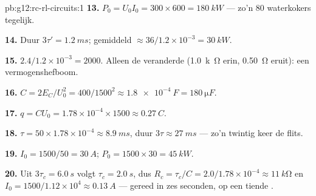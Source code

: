 \begin{solution}{pb:g12:rc-rl-circuits:1}
\textbf{13.} $P_0 = U_0 I_0 = 300 \times 600 = \qty{180}{kW}$ --- zo'n $80$
waterkokers tegelijk.

\textbf{14.} Duur $3\tau' = \qty{1.2}{ms}$; gemiddeld 
$\approx 36/1.2\times10^{-3} = \qty{30}{kW}$.

\textbf{15.} $2.4/1.2\times10^{-3} = 2000$. Alleen de  veranderde
(\qty{1.0}{k\ohm} erin, \qty{0.50}{\ohm} eruit): een vermogenshefboom.

\textbf{16.} $C = 2E_C/U_0^2 = 400/1500^2 \approx \qty{1.8e-4}{F} =
\qty{180}{\micro F}$.

\textbf{17.} $q = CU_0 = 1.78\times10^{-4} \times 1500 \approx
\qty{0.27}{C}$.

\textbf{18.} $\tau = 50 \times 1.78\times10^{-4} \approx \qty{8.9}{ms}$, duur
$3\tau \approx \qty{27}{ms}$ --- zo'n twintig keer de flits.

\textbf{19.} $I_0 = 1500/50 = \qty{30}{A}$;
$P_0 = 1500 \times 30 = \qty{45}{kW}$.

\textbf{20.} Uit $3\tau_c = \qty{6.0}{s}$ volgt $\tau_c = \qty{2.0}{s}$, dus
$R_c = \tau_c/C = 2.0/1.78\times10^{-4} \approx \qty{11}{k\ohm}$ en
$I_0 = 1500/1.12\times10^{4} \approx \qty{0.13}{A}$ --- gereed in zes seconden,
op een tiende .
\end{solution}
